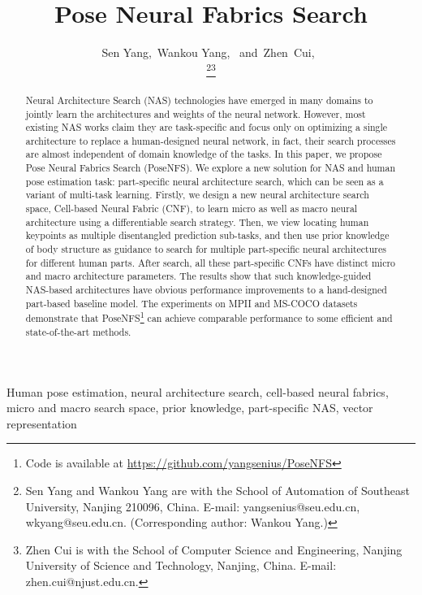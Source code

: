 \documentclass[journal]{IEEEtran}
\begin{document}
\title{Pose Neural Fabrics Search}




\author{Sen Yang,~Wankou Yang,~
	and~Zhen~Cui,~
	
\thanks{Sen Yang and Wankou Yang are with the School of Automation of Southeast University, Nanjing 210096, China. E-mail: yangsenius@seu.edu.cn, wkyang@seu.edu.cn. (Corresponding author: Wankou Yang.)}\thanks{Zhen Cui is with the School of Computer Science and Engineering, Nanjing University of Science and Technology, Nanjing, China. E-mail: zhen.cui@njust.edu.cn.}}


\maketitle

\begin{abstract}

  Neural Architecture Search (NAS) technologies have emerged in many domains to jointly learn the architectures and weights of the neural network. However, most existing NAS works claim they are task-specific and focus only on optimizing a single architecture to replace a human-designed neural network, in fact, their search processes are almost independent of domain knowledge of the tasks. In this paper, we propose Pose Neural Fabrics Search (PoseNFS). We explore a new solution for NAS and human pose estimation task: part-specific neural architecture search, which can be seen as a variant of multi-task learning. Firstly, we design a new neural architecture search space, Cell-based Neural Fabric (CNF), to learn micro as well as macro neural architecture using a differentiable search strategy. Then, we view locating human keypoints as multiple disentangled prediction sub-tasks, and then use prior knowledge of body structure as guidance to search for multiple part-specific neural architectures for different human parts. After search, all these part-specific CNFs have distinct micro and macro architecture parameters. The results show that such knowledge-guided NAS-based architectures have obvious performance improvements to a hand-designed part-based baseline model. The experiments on MPII and MS-COCO datasets demonstrate that PoseNFS\footnote{Code is available at \url{https://github.com/yangsenius/PoseNFS}} can achieve comparable performance to some efficient and state-of-the-art methods.
\end{abstract}

\begin{IEEEkeywords}
Human pose estimation, neural architecture search, cell-based neural fabrics, micro and macro search space, prior knowledge, part-specific NAS, vector representation
\end{IEEEkeywords}
\end{document}

